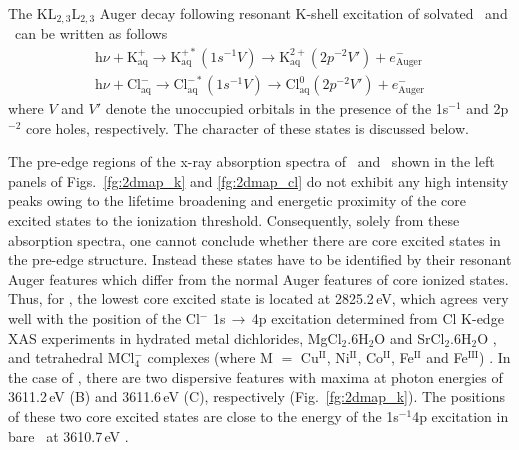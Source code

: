 The KL$_{2,3}$L$_{2,3}$ Auger decay following resonant K-shell excitation of solvated \ki~and \cli~can be written as follows
%
\begin{align*}
\text{h}\nu + \text{K}^{+}_{\text{aq}} \rightarrow \text{K}^{+*}_{\text{aq}} (1s^{-1}V) \rightarrow \text{K}^{2+}_{\text{aq}} (2p^{-2}V') + e^{-}_{\text{Auger}}\\
%
\text{h}\nu + \text{Cl}^{-}_{\text{aq}} \rightarrow \text{Cl}^{-*}_{\text{aq}} (1s^{-1}V) \rightarrow \text{Cl}^{0}_{\text{aq}}(2p^{-2}V') + e^{-}_{\text{Auger}}
\end{align*}
%
where $V$ and $V'$ denote the unoccupied orbitals in the presence of the 1s$^{-1}$ and 2p$^{-2}$ core holes, respectively. The character of these states is discussed below.

The pre-edge regions of the x-ray absorption spectra of \ki~and \cli~shown in the left panels of Figs.\ \ref{fg:2dmap_k} and \ref{fg:2dmap_cl} do not exhibit any high intensity peaks owing to the lifetime broadening and energetic proximity of the core excited states to the ionization threshold. Consequently, solely from these absorption spectra, one cannot conclude whether there are core excited states in the pre-edge structure. Instead these states have to be identified by their resonant Auger features which differ from the normal Auger features of core ionized states. Thus, for \cli, the lowest core excited state is located at 2825.2\,eV, which agrees very well with the position of the Cl$^{-}$ 1s$\,\rightarrow\,$4p excitation determined from Cl K-edge XAS experiments in hydrated metal dichlorides, MgCl$_2$.6H$_2$O and SrCl$_2$.6H$_2$O \citep{sugiura82:681}, and tetrahedral MCl$_{4}^{-}$ complexes (where M $=$ Cu$^{\text{II}}$, Ni$^{\text{II}}$, Co$^{\text{II}}$, Fe$^{\text{II}}$ and Fe$^{\text{III}}$) \citep{shadle95:2259}. In the case of \ki, there are two dispersive features with maxima at photon energies of 3611.2\,eV (B) and 3611.6\,eV (C), respectively (Fig.\ \ref{fg:2dmap_k}). The positions of these two core excited states are close to the energy of the 1s$^{-1}$4p excitation in bare \ki~at 3610.7\,eV \citep{hertlein06:062715}.


